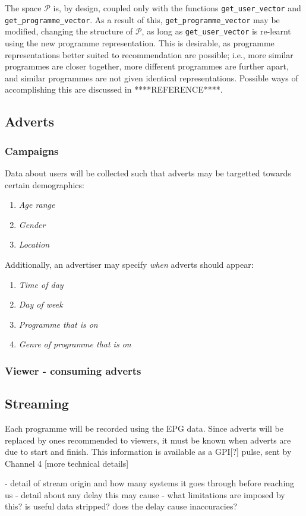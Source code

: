 The space $\mathcal{P}$ is, by design, coupled only with the functions \texttt{get\_user\_vector} and \texttt{get\_programme\_vector}. As a result of this, \texttt{get\_programme\_vector} may be modified, changing the structure of $\mathcal{P}$, as long as \texttt{get\_user\_vector} is re-learnt using the new programme representation. This is desirable, as programme representations better suited to recommendation are possible; i.e., more similar programmes are closer together, more different programmes are further apart, and similar programmes are not given identical representations. Possible ways of accomplishing this are discussed in ****REFERENCE****.


\subsection{Adverts}
\label{sec:design_adverts}



\subsubsection{Campaigns}

Data about users will be collected such that adverts may be targetted towards certain demographics:
\begin{enumerate}
\item \textit{Age range}
\item \textit{Gender}
\item \textit{Location}
\end{enumerate}

Additionally, an advertiser may specify \textit{when} adverts should appear:
\begin{enumerate}
\item \textit{Time of day}
\item \textit{Day of week}
\item \textit{Programme that is on}
\item \textit{Genre of programme that is on}
\end{enumerate}

\subsubsection{Viewer - consuming adverts}

\subsection{Streaming}
Each programme will be recorded using the EPG data. Since adverts will be replaced by ones recommended to viewers, it must be known when adverts are due to start and finish. This information is available as a GPI[?] pulse, sent by Channel 4 [more technical details]

- detail of stream origin and how many systems it goes through before reaching us
- detail about any delay this may cause
- what limitations are imposed by this? is useful data stripped? does the delay cause inaccuracies?

